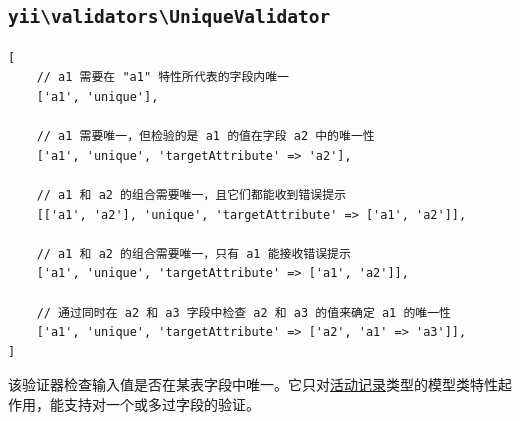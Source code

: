 \subsection{\texttt{yii{\allowbreak{}\textbackslash}validators{\allowbreak{}\textbackslash}UniqueValidator} \label{tutorial-core-validators.md::unique}}
\lstset{language=php}\begin{lstlisting}
[
    // a1 需要在 "a1" 特性所代表的字段内唯一
    ['a1', 'unique'],

    // a1 需要唯一，但检验的是 a1 的值在字段 a2 中的唯一性
    ['a1', 'unique', 'targetAttribute' => 'a2'],

    // a1 和 a2 的组合需要唯一，且它们都能收到错误提示
    [['a1', 'a2'], 'unique', 'targetAttribute' => ['a1', 'a2']],

    // a1 和 a2 的组合需要唯一，只有 a1 能接收错误提示
    ['a1', 'unique', 'targetAttribute' => ['a1', 'a2']],

    // 通过同时在 a2 和 a3 字段中检查 a2 和 a3 的值来确定 a1 的唯一性
    ['a1', 'unique', 'targetAttribute' => ['a2', 'a1' => 'a3']],
]
\end{lstlisting}
该验证器检查输入值是否在某表字段中唯一。它只对\hyperref[db-active-record.md]{活动记录}类型的模型类特性起作用，能支持对一个或多过字段的验证。

